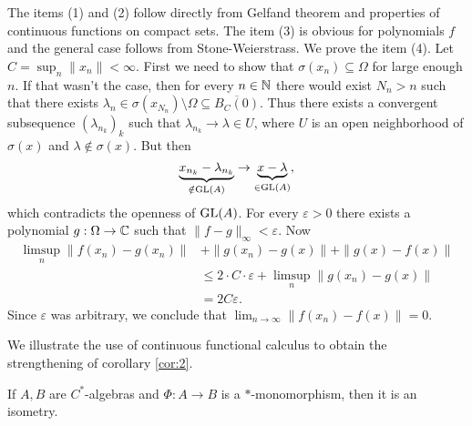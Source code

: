 \begin{myproof}
  The items (1) and (2) follow directly from Gelfand theorem and properties of continuous functions  
  on compact sets. The item (3) is obvious for polynomials $f$ and the general case follows from Stone-Weierstrass.
  We prove the item (4). Let $C = \sup_n \|x_n\| < \infty$. First we need to show that 
  $\sigma(x_n) \subseteq \Omega$ for large enough $n$. If that wasn't the case, then for every $n \in \mathbb {N}$ there would exist $N_n > n$
  such that there exists $\lambda_n \in \sigma(x_{N_n}) \setminus \Omega \subseteq \overline{B_C (0)}$.
  Thus there exists a convergent subsequence $(\lambda_{n_k})_k$ such that $\lambda_{n_k} \to \lambda \in U$,
  where $U$ is an open neighborhood of $\sigma(x)$
  and $\lambda \notin \sigma(x)$. But then $$\underbrace{x_{n_k} - \lambda_{n_k}}_{\notin \operatorname{GL}(A)} \to \underbrace{x - \lambda}_{\in \operatorname{GL}(A)},$$
  which contradicts the openness of $\operatorname{GL}(A)$. For every $\varepsilon > 0$ there exists a polynomial $g: \Omega \to \mathbb {C}$ such that $\|f - g\|_{\infty} < \varepsilon$.
  Now \begin{align*}
    \limsup_{n} \|f(x_n) - g(x_n)\| &+ \|g(x_n) - g(x)\| + \|g(x) - f(x)\|\\
     &\leq 2 \cdot C \cdot \varepsilon + \limsup_{n} \|g(x_n) - g(x)\| \\
     &= 2 C\varepsilon.
  \end{align*}
  Since $\varepsilon$ was arbitrary, we conclude that $\lim_{n \to \infty} \| f(x_n) - f(x)\| = 0$.
\end{myproof}

We illustrate the use of continuous functional calculus to obtain the strengthening of corollary \ref{cor:2}.

\begin{corollary}
    If $A, B$ are $C^*$-algebras and $\Phi: A \to B$ is a $*$-monomorphism,
    then it is an isometry.
\end{corollary}

